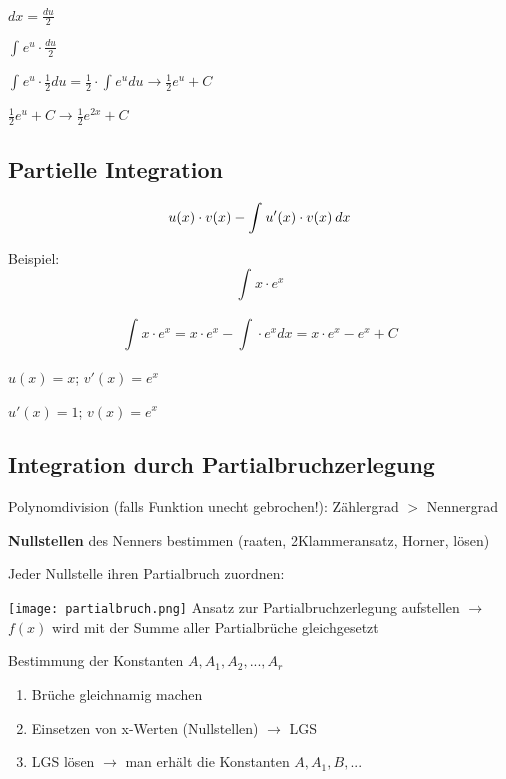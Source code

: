 \begin{multicols*}{3}
\begin{multicols*}{2}
        { $ dx = \frac{du}{2} $}

        { $ \int_{}{}e^u \cdot  \frac{du}{2} $}

    \end{multicols*}

    { $ \int_{}{}e^u \cdot  \frac{1}{2}du = \frac{1}{2} \cdot  \int_{}{}e^u du \rightarrow \frac{1}{2} e^u + C   $}


    { $\frac{1}{2} e^u + C \rightarrow \frac{1}{2} e^{2x} + C$ }




    \subsection{Partielle Integration}
    {\large $$u(x)\cdot v(x) - \int_{}^{}u'(x) \cdot v(x) \hspace{2px}  dx$$}

    \begin{multicols*}{2}
        {Beispiel:}
        \[ \int_{}{}x\cdot e^x\]

        $$ \int_{}{}x\cdot e^x = x\cdot e^x -  \int_{}{}\cdot e^x dx = x\cdot e^x - e^x + C $$
        \columnbreak

        {$u(x)=x$; $v'(x)=e^x$}

        {$u'(x)=1$; $v(x)=e^x$}

    \end{multicols*}


    \vfill\null
    \columnbreak


    \subsection{Integration durch Partialbruchzerlegung}
    {    Polynomdivision (falls Funktion unecht gebrochen!): Zählergrad  $>$ Nennergrad }



    { \textbf{Nullstellen} des Nenners bestimmen (raaten, 2Klammeransatz, Horner, lösen)}

    { Jeder Nullstelle ihren Partialbruch zuordnen:}

    \texttt{[image: partialbruch.png]}
    { Ansatz zur Partialbruchzerlegung aufstellen $\rightarrow$ $f(x)$ wird mit der Summe aller Partialbrüche gleichgesetzt}

    { Bestimmung der Konstanten $A,A_1,A_2,...,A_r$}
    \begin{enumerate}
        \itemsep0em
        \item Brüche gleichnamig machen
        \item Einsetzen von x-Werten (Nullstellen) $\rightarrow$ LGS
        \item LGS lösen $\rightarrow$ man erhält die Konstanten $A,A_1,B,...$
    \end{enumerate}



\end{multicols*}
